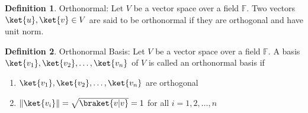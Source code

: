 \documentclass[12pt, oneside]{book}
\theoremstyle{definition}
\newtheorem{definition}{Definition}[section]
\theoremstyle{definition}
\theoremstyle{remark}
\begin{document}
\begin{definition}
    Orthonormal: Let $V$ be a vector space over a field $\mathbb{F}$. Two vectors $\ket{u},\ket{v}\in V$ are said to be orthonormal if they are orthogonal and have unit norm.
\end{definition}

\begin{definition}
    Orthonormal Basis: Let $V$ be a vector space over a field $\mathbb{F}$. A basis $\ket{v_1},\ket{v_2},\ldots,\ket{v_n}$ of $V$ is called an orthonormal basis if
    \begin{enumerate}
        \item $\ket{v_1},\ket{v_2},\ldots,\ket{v_n}$ are orthogonal
        \item $\|\ket{v_i}\|= \sqrt{\braket{v|v}} = 1$ for all $i=1,2,\ldots,n$
    \end{enumerate}
\end{definition}
\end{document}
